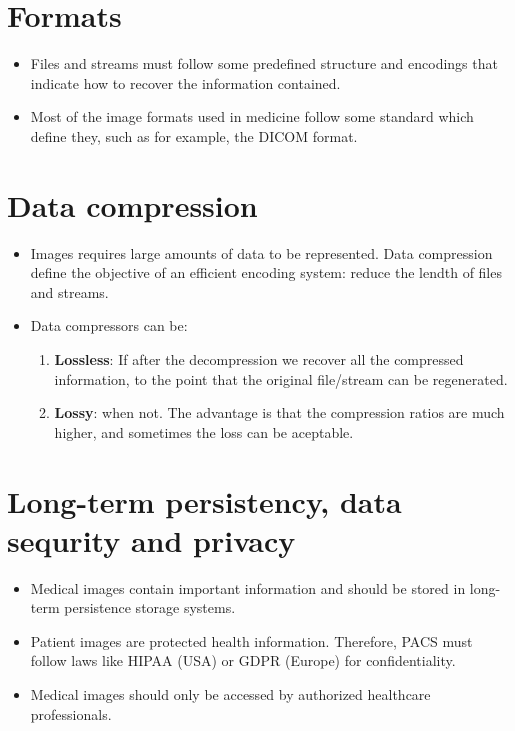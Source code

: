 \section{Formats}
\begin{itemize}
\item Files and streams must follow some predefined structure and
encodings that indicate how to recover the information contained.
\item Most of the image formats used in medicine follow some standard
which define they, such as for example, the DICOM format.
\end{itemize}

\section{Data compression}
\begin{itemize}
\item Images requires large amounts of data to be represented. Data
compression define the objective of an efficient encoding system:
reduce the lendth of files and streams.
\item Data compressors can be:
\begin{enumerate}
\item \textbf{Lossless}: If after the decompression we recover all the
compressed information, to the point that the original file/stream can
be regenerated.
\item \textbf{Lossy}: when not. The advantage is that the compression
ratios are much higher, and sometimes the loss can be aceptable.
\end{enumerate}
\end{itemize}

\section{Long-term persistency, data sequrity and privacy}
\begin{itemize}
\item Medical images contain important information and should be
  stored in long-term persistence storage systems.
\item Patient images are protected health information. Therefore,
  \gls{PACS} must follow laws like HIPAA (USA) or GDPR (Europe) for
  confidentiality.
\item Medical images should only be accessed by authorized healthcare
  professionals.
\end{itemize}